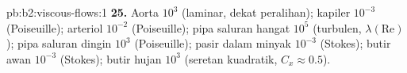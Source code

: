 \begin{solution}{pb:b2:viscous-flows:1}
\textbf{25.} Aorta $10^3$ (laminar, dekat peralihan); kapiler $10^{-3}$
(Poiseuille); arteriol $10^{-2}$ (Poiseuille); pipa saluran hangat $10^5$
(turbulen, $\lambda(\mathrm{Re})$); pipa saluran dingin $10^3$ (Poiseuille); pasir dalam
minyak $10^{-3}$ (Stokes); butir awan $10^{-3}$ (Stokes); butir hujan $10^3$
(seretan kuadratik, $C_x \approx 0.5$).
\end{solution}
